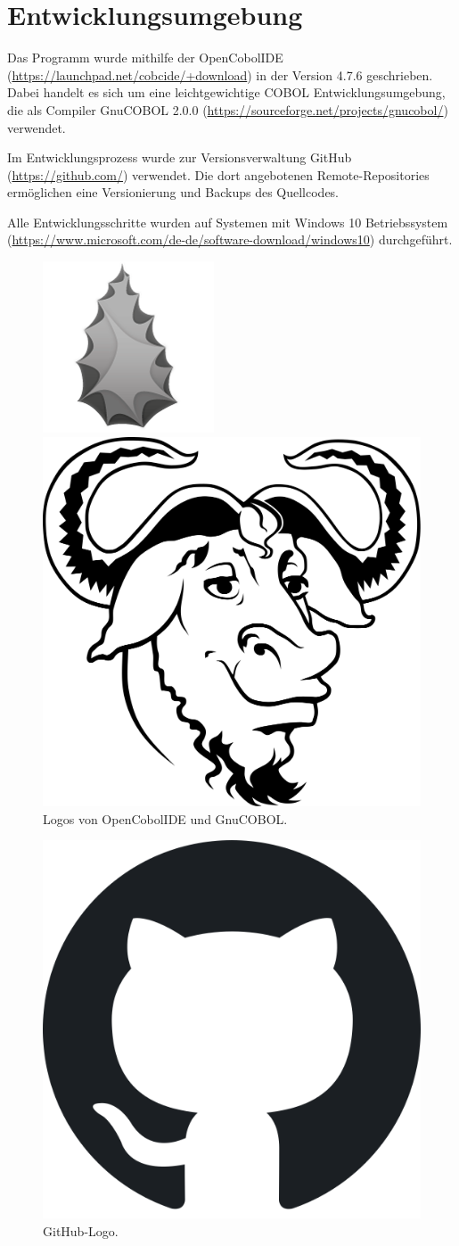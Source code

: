 \chapter{Entwicklungsumgebung}\label{ch:entwicklungsumgebung}

Das Programm wurde mithilfe der OpenCobolIDE (\url{https://launchpad.net/cobcide/+download}) in der Version 4.7.6 geschrieben.
Dabei handelt es sich um eine leichtgewichtige COBOL Entwicklungsumgebung, die als Compiler GnuCOBOL 2.0.0 (\url{https://sourceforge.net/projects/gnucobol/}) verwendet.

Im Entwicklungsprozess wurde zur Versionsverwaltung GitHub (\url{https://github.com/}) verwendet.
Die dort angebotenen Remote-Repositories ermöglichen eine Versionierung und Backups des Quellcodes.

Alle Entwicklungsschritte wurden auf Systemen mit Windows 10 Betriebssystem (\url{https://www.microsoft.com/de-de/software-download/windows10}) durchgeführt.

\begin{figure}[htb]
    \centering
    \begin{minipage}{.5\textwidth}
        \centering
        \includegraphics[width=.4\linewidth]{images/opencobol-logo}
    \end{minipage}%
    \begin{minipage}{.5\textwidth}
        \centering
        \includegraphics[width=.4\linewidth]{images/Gnu-COBOL}
    \end{minipage}
    \caption{Logos von OpenCobolIDE und GnuCOBOL.}
    \label{fig:cobol-logos}
\end{figure}

\begin{figure}[htb]
    \centering
    \includegraphics[width=.15\linewidth]{images/GitHub-Logo}
    \caption{
        GitHub-Logo.
    }
    \label{fig:github}
\end{figure}
